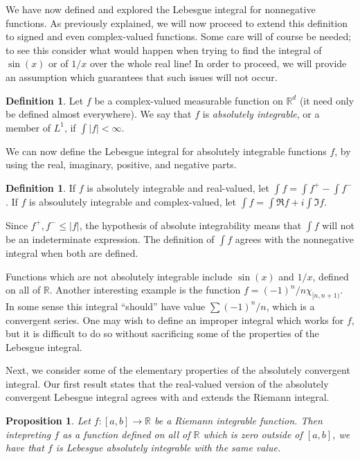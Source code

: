 \documentclass[11pt,oneside]{amsbook}
\newcommand{\RR}{{\mathbb R}}
\theoremstyle{definition}
\theoremstyle{plain}
\newtheorem{prop}[thm]{Proposition}
\theoremstyle{definition}
\newtheorem{defn}[thm]{Definition}
\theoremstyle{remark}
\numberwithin{equation}{section}
\numberwithin{figure}{section}
\begin{document}
We have now defined and explored the Lebesgue integral for nonnegative functions. As previously explained, we will now proceed to extend this definition to signed and even complex-valued functions. Some care will of course be needed; to see this consider what would happen when trying to find the integral of $\sin(x)$ or of $1/x$ over the whole real line! In order to proceed, we will provide an assumption which guarantees that such issues will not occur.

\begin{defn}
  Let $f$ be a complex-valued measurable function on $\RR^d$ (it need only be defined almost everywhere). We say that $f$ is \emph{absolutely integrable}, or a member of $L^1$, if $\int|f|<\infty$.
\end{defn}

We can now define the Lebesgue integral for absolutely integrable functions $f$, by using the real, imaginary, positive, and negative parts.

\begin{defn}
  If $f$ is absolutely integrable and real-valued, let $\int f=\int f^+-\int f^-$. If $f$ is absoulutely integrable and complex-valued, let $\int f=\int\Re f+i\int\Im f$.
\end{defn}

Since $f^+,f^-\leq|f|$, the hypothesis of absolute integrability means that $\int f$ will not be an indeterminate expression. The definition of $\int f$ agrees with the nonnegative integral when both are defined.

Functions which are not absolutely integrable include $\sin(x)$ and $1/x$, defined on all of $\RR$. Another interesting example is the function $f=(-1)^n/n\chi_{[n,n+1)}$. In some sense this integral ``should'' have value $\sum(-1)^n/n$, which is a convergent series. One may wish to define an improper integral which works for $f$, but it is difficult to do so without sacrificing some of the properties of the Lebesgue integral.

Next, we consider some of the elementary properties of the absolutely convergent integral. Our first result states that the real-valued version of the absolutely convergent Lebesgue integral agrees with and extends the Riemann integral.



\begin{prop}
  Let $f\colon[a,b]\to\RR$ be a Riemann integrable function. Then intepreting $f$ as a function defined on all of $\RR$ which is zero outside of $[a,b]$, we have that $f$ is Lebesgue absolutely integrable with the same value.
\end{prop}
\end{document}
